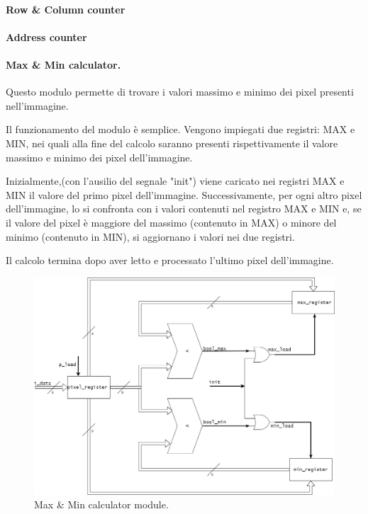 \paragraph{Row \& Column counter}
\paragraph{Address counter}
\paragraph{Max \& Min calculator.}

Questo modulo permette di trovare i valori massimo e minimo dei pixel presenti nell'immagine.

Il funzionamento del modulo è semplice. Vengono impiegati due registri: MAX e MIN, nei quali alla fine del calcolo saranno presenti rispettivamente il valore massimo e minimo dei pixel dell'immagine.

Inizialmente,(con l'ausilio del segnale "init") viene caricato nei registri MAX e MIN il valore del primo pixel dell'immagine. Successivamente, per ogni altro pixel dell'immagine, lo si confronta con i valori contenuti nel registro MAX e MIN e, se il valore del pixel è maggiore del massimo (contenuto in MAX) o minore del minimo (contenuto in MIN), si aggiornano i valori nei due registri.

Il calcolo termina dopo aver letto e processato l'ultimo pixel dell'immagine.

\begin{figure}[h!] %
  \includegraphics[width=\linewidth]{max_min_module}
  \caption{Max \& Min calculator module.}
  \label{fig:maxMin}
\end{figure}

